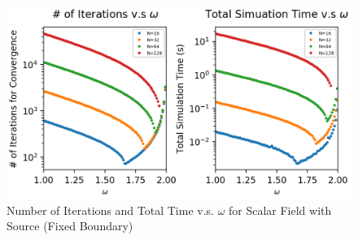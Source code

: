 \documentclass[a4paper,10pt]{article}
\begin{document}
\begin{large}
\begin{figure}[htbp] %
\centering %
\includegraphics[width=15cm]{Problem_2_Optimal_omega_with_Charge_Fixed_Boundary.png} %
\caption{Number of Iterations and Total Time v.s. $\omega$ for Scalar Field with Source (Fixed Boundary)}
\end{figure}

\end{large}
\newpage
\end{document}
